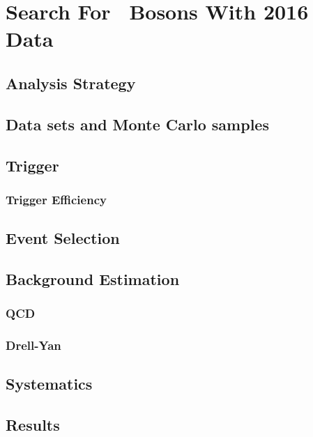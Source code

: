 \chapter[Search For \Zprime~Bosons With 2016 Data]{Search For \Zprime~Bosons With 2016 Data}
\label{chap:Analysis}

\section{Analysis Strategy}
\label{sec:Strategy}

\section{Data sets and Monte Carlo samples}
\label{sec:Samples}

\section{Trigger}
\label{sec:Trigger}

\subsection{Trigger Efficiency}
\label{subsec:TriggerEff}

\section{Event Selection}
\label{sec:EventSelection}

\section{Background Estimation}
\label{sec:BackgroundEstimation}

\subsection{QCD}
\label{subsec:QCD}

\subsection{Drell-Yan}
\label{subsec:QDY}

\section{Systematics}
\label{sec:Systematics}

\section{Results}
\label{sec:Results}
